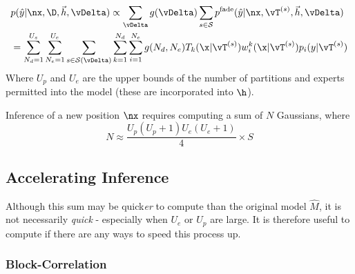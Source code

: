         \begin{align}
            \begin{split}
            & p(\hat{y}|\nx, \D,\vec{h},\vDelta) \propto \sum_\vDelta g(\vDelta) \sum_{s \in \mathcal{S}} p^\text{fade}(\hat{y} | \nx, \vT^{(s)}, \vec{h},\vDelta)
            \\
            & =  \sum_{N_d=1}^{U_s} \sum_{N_e=1}^{U_e}   \sum_{s \in \mathcal{S}(\vDelta)} \sum_{k=1}^{N_d} \sum_{i=1}^{N_e} g(N_d,N_e) T_k(\x| \vT^{(s)}) w_i^k(\x | \vT^{(s)}) p_i(y|\vT^{(s)})
            \end{split}
        \end{align}
        Where $U_p$ and $U_e$ are the upper bounds of the number of partitions and experts permitted into the model (these are incorporated into $\h$).

        Inference of a new position $\nx$ requires computing a sum of $N$ Gaussians, where
        \begin{equation}
            N \approx \frac{U_p (U_p+1)U_e(U_e+1)}{4} \times S
        \end{equation}

    \subsection{Accelerating Inference}

        Although this sum may be quick\textit{er} to compute than the original model $\hat{M}$, it is not necessarily \textit{quick} - especially when $U_e$ or $U_p$ are large. It is therefore useful to compute if there are any ways to speed this process up.

        \subsubsection{Block-Correlation}

